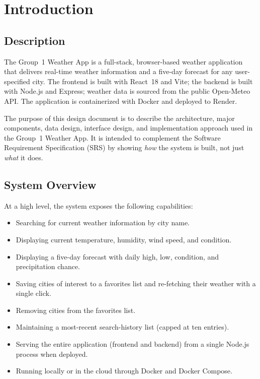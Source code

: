 \documentclass[11pt,letterpaper]{article}
\begin{document}
\tableofcontents
\clearpage

\section{Introduction}

\subsection{Description}
The Group~1 Weather App is a full-stack, browser-based weather application that delivers real-time weather information and a five-day forecast for any user-specified city. The frontend is built with React~18 and Vite; the backend is built with Node.js and Express; weather data is sourced from the public Open-Meteo API. The application is containerized with Docker and deployed to Render.

The purpose of this design document is to describe the architecture, major components, data design, interface design, and implementation approach used in the Group~1 Weather App. It is intended to complement the Software Requirement Specification (SRS) by showing \emph{how} the system is built, not just \emph{what} it does.

\subsection{System Overview}
At a high level, the system exposes the following capabilities:
\begin{itemize}
  \item Searching for current weather information by city name.
  \item Displaying current temperature, humidity, wind speed, and condition.
  \item Displaying a five-day forecast with daily high, low, condition, and precipitation chance.
  \item Saving cities of interest to a favorites list and re-fetching their weather with a single click.
  \item Removing cities from the favorites list.
  \item Maintaining a most-recent search-history list (capped at ten entries).
  \item Serving the entire application (frontend and backend) from a single Node.js process when deployed.
  \item Running locally or in the cloud through Docker and Docker Compose.
\end{itemize}
\end{document}
